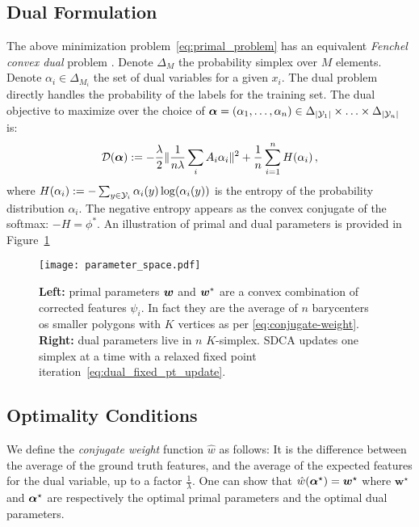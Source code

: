 \subsection{Dual Formulation}
The above minimization problem~\eqref{eq:primal_problem} has an equivalent {\it Fenchel convex dual} problem \citep{lebanon2002boosting}.
Denote $\Delta_{M}$ the probability simplex over $M$ elements.
Denote $\alpha_i \in \Delta_{M_i}$ the set of dual variables for a given $x_i$.
The dual problem directly handles the probability of the labels for the training set.
The dual objective to maximize over the choice of $\boldsymbol{\alpha} = (\alpha_1, \ldots, \alpha_n) \in \Delta_{|{\mathcal Y}_1|} \times \ldots \times \Delta_{|{\mathcal Y}_n|} $ is:
\begin{equation}
	\label{dual problem}
	{\mathcal D}(\boldsymbol{\alpha}) := -\frac{\lambda}{2} \| \frac{1}{n \lambda} \sum_i A_i \alpha_i \|^2
	+ \frac{1}{n} \sum_{i=1}^n H(\alpha_i) \, ,
\end{equation}
where $H(\alpha_i) := - \sum_{y \in {\mathcal Y}_i} \alpha_i(y) \log(\alpha_i(y))$ is the entropy of the probability distribution $\alpha_i$. The negative entropy appears as the convex conjugate of the softmax: $-H = \phi^*$.
An illustration of primal and dual parameters is provided in Figure~\ref{fig:sdca}

\begin{figure}[t]
	\centering
	\texttt{[image: parameter\_space.pdf]}
	\caption[
		Illustration of SDCA
	]{
		\textbf{Left:} primal parameters  $\boldsymbol{w}$ and $\boldsymbol{w}^*$ are a convex combination of corrected features $\psi_i$. In fact they are the average of $n$  barycenters os smaller polygons with $K$ vertices as per \eqref{eq:conjugate-weight}.
		\textbf{Right:} dual parameters live in $n$ $K$-simplex. SDCA updates one simplex at a time with a relaxed fixed point iteration~\eqref{eq:dual_fixed_pt_update}.
	}
	\label{fig:sdca}
\end{figure}

\subsection{Optimality Conditions}
We define the \emph{conjugate weight} function $\hat{w}$ as follows:
It is the difference between the average of the ground truth features, and the average of the expected features for the dual variable, up to a factor $\frac{1}{\lambda}$.
One can show that $\hat{w}(\boldsymbol{\alpha}^{\star}) = \bm w^{\star}$ where $\bm w^{\star}$ and $\boldsymbol{\alpha}^{\star}$ are respectively the optimal primal parameters and the optimal dual parameters.

